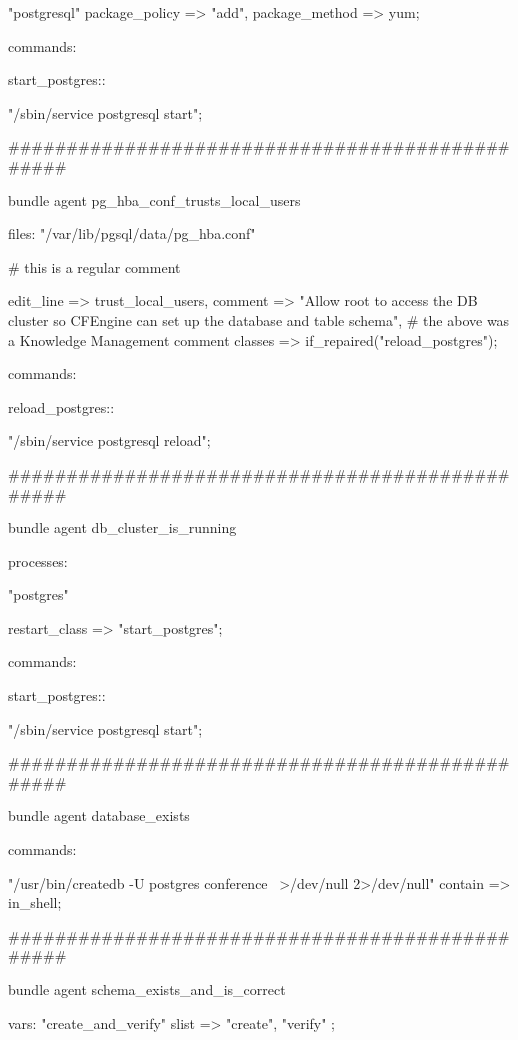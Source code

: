 \begin{codelisting}
\begin{code}
{      "postgresql"
        package_policy => "add",
        package_method => yum;


  commands:

    start_postgres::

      "/sbin/service postgresql start";


}

################################################

bundle agent pg_hba_conf_trusts_local_users {


  files:
      "/var/lib/pgsql/data/pg_hba.conf"

      # this is a regular comment

        edit_line => trust_local_users,
        comment => "Allow root to access the DB cluster
                    so CFEngine can set up the database
                    and table schema",
      # the above was a Knowledge Management comment
        classes => if_repaired("reload_postgres");

  commands:

    reload_postgres::

      "/sbin/service postgresql reload";


}


################################################


bundle agent db_cluster_is_running {


  processes:

      "postgres"

        restart_class => "start_postgres";


  commands:

    start_postgres::

      "/sbin/service postgresql start";

}




################################################

bundle agent database_exists {

  commands:

      "/usr/bin/createdb -U postgres conference \
         >/dev/null 2>/dev/null"
        contain => in_shell;

}


################################################


bundle agent schema_exists_and_is_correct {

  vars:
      "create_and_verify"
        slist => { "create", "verify" };


}
\end{code}
\end{codelisting}
